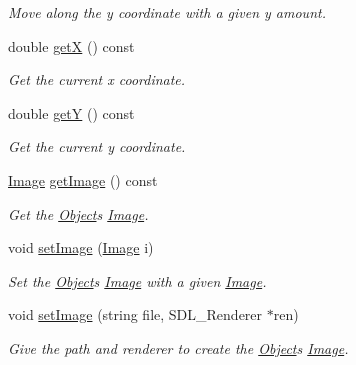 \begin{DoxyCompactItemize}
\begin{DoxyCompactList}\small\item\em Move along the y coordinate with a given y amount. \end{DoxyCompactList}\item 
\mbox{\label{classObject_a4376dcdda09a4fd3a0328d028315bcde}} 
double \hyperlink{classObject_a4376dcdda09a4fd3a0328d028315bcde}{getX} () const
\begin{DoxyCompactList}\small\item\em Get the current x coordinate. \end{DoxyCompactList}\item 
\mbox{\label{classObject_a766d0937e41a50003498ac0d81ea8af3}} 
double \hyperlink{classObject_a766d0937e41a50003498ac0d81ea8af3}{getY} () const
\begin{DoxyCompactList}\small\item\em Get the current y coordinate. \end{DoxyCompactList}\item 
\mbox{\label{classObject_aba9c1086155bc50bdae65eac5566d5f9}} 
\hyperlink{classImage}{Image} \hyperlink{classObject_aba9c1086155bc50bdae65eac5566d5f9}{get\+Image} () const
\begin{DoxyCompactList}\small\item\em Get the \hyperlink{classObject}{Object}\textquotesingle{}s \hyperlink{classImage}{Image}. \end{DoxyCompactList}\item 
\mbox{\label{classObject_a131f81446cda68e47ee7e94d247e6ea1}} 
void \hyperlink{classObject_a131f81446cda68e47ee7e94d247e6ea1}{set\+Image} (\hyperlink{classImage}{Image} i)
\begin{DoxyCompactList}\small\item\em Set the \hyperlink{classObject}{Object}\textquotesingle{}s \hyperlink{classImage}{Image} with a given \hyperlink{classImage}{Image}. \end{DoxyCompactList}\item 
\mbox{\label{classObject_a7f984ff2fb0c60b942a1018fc48417ae}} 
void \hyperlink{classObject_a7f984ff2fb0c60b942a1018fc48417ae}{set\+Image} (string file, S\+D\+L\+\_\+\+Renderer $\ast$ren)
\begin{DoxyCompactList}\small\item\em Give the path and renderer to create the \hyperlink{classObject}{Object}\textquotesingle{}s \hyperlink{classImage}{Image}. \end{DoxyCompactList}\item 

\end{DoxyCompactItemize}
